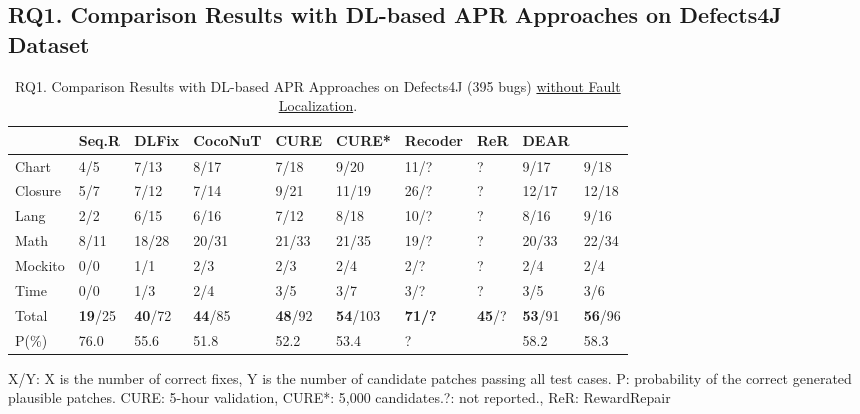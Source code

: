 \subsection{\bf RQ1. Comparison Results with DL-based APR Approaches on Defects4J Dataset}

\begin{table}[t]
  \caption{RQ1. Comparison Results with DL-based APR Approaches on Defects4J (395 bugs) \underline {without Fault Localization}.}
  \vspace{-6pt}
  \tabcolsep 2.5pt
  {\footnotesize
			\begin{center}
				\renewcommand{\arraystretch}{1}
				\begin{tabular}{p{0.7cm}<{\centering}|p{0.6cm}<{\centering}|p{0.6cm}<{\centering}|p{0.95cm}<{\centering}|p{0.7cm}<{\centering}|p{0.7cm}<{\centering}|p{0.9cm}<{\centering}|p{0.5cm}<{\centering}|p{0.7cm}<{\centering}|p{0.7cm}<{\centering}}
					
					\hline
					&\textbf{Seq.R}&\textbf{DLFix}& \textbf{CocoNuT}&\textbf{CURE}&\textbf{CURE*}&\textbf{Recoder}& {\bf ReR} & {\bf DEAR} & \textbf{\tool}\\
					\hline
					Chart  & 4/5   & 7/13  & 8/17  & 7/18  & 9/20 & 11/? & ? & 9/17 & 9/18\\
					Closure& 5/7   & 7/12  & 7/14  & 9/21 & 11/19  & 26/? & ? & 12/17 & 12/18\\
					Lang   & 2/2   & 6/15  & 6/16  & 7/12 & 8/18 & 10/? & ? & 8/16 & 9/16\\
					Math    & 8/11  & 18/28 & 20/31 & 21/33 & 21/35 & 19/? & ? & 20/33 & 22/34\\
					Mockito & 0/0   & 1/1   & 2/3   & 2/3  &2/4 & 2/? & ? & 2/4 & 2/4\\
					Time    & 0/0   & 1/3   & 2/4   & 3/5  &3/7 & 3/? & ? & 3/5 & 3/6\\
					\hline
					Total   & {\bf 19}/25 & {\bf 40}/72 & {\bf 44}/85 & {\bf 48}/92 & {\bf 54}/103 & {\bf 71/?} & {\bf 45}/? &{\bf 53}/91 & {\bf 56}/96\\
					\hline
					P(\%)  & 76.0  & 55.6  & 51.8  & 52.2  &  53.4 & ? & & 58.2 & 58.3\\
					\hline
				\end{tabular}
			{\footnotesize{
				X/Y: X is the number of correct fixes, Y is the number of candidate patches passing all test cases. P: probability of the correct generated plausible patches. CURE: 5-hour validation, CURE*: 5,000 candidates.?: not reported., ReR: RewardRepair}}

				\label{RQ1_defect4j}
			\end{center}
                }
		\end{table}

